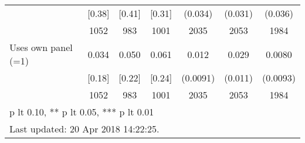 \begin{table}[htbp]
\begin{tabular*}{1\hsize}{@{\hskip\tabcolsep\extracolsep\fill}l*{1}{cccccc}}
                                &   [0.38]&   [0.41]&   [0.31]&  (0.034)         &  (0.031)         &  (0.036)         \\
                                &     1052&      983&     1001&     2035         &     2053         &     1984         \\
Uses own panel (=1)             &    0.034&    0.050&    0.061&    0.012         &    0.029\sym{***}&   0.0080         \\
                                &   [0.18]&   [0.22]&   [0.24]& (0.0091)         &  (0.011)         & (0.0093)         \\
                                &     1052&      983&     1001&     2035         &     2053         &     1984         \\
\bottomrule
\multicolumn{7}{l}{\footnotesize * p lt 0.10, ** p lt 0.05, *** p lt 0.01}\\
\multicolumn{7}{l}{\footnotesize Last updated: 20 Apr 2018 14:22:25.}\\
\end{tabular*}
\end{table}
